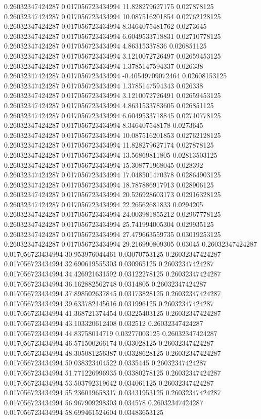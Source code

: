 0.26032347424287 0.017056723434994 11.828279627175 0.027878125
0.26032347424287 0.017056723434994 10.087516201854 0.02762128125
0.26032347424287 0.017056723434994 8.3464075481762 0.0273645
0.26032347424287 0.017056723434994 6.6049533718831 0.02710778125
0.26032347424287 0.017056723434994 4.86315337836 0.026851125
0.26032347424287 0.017056723434994 3.1210072726497 0.02659453125
0.26032347424287 0.017056723434994 1.3785147594337 0.026338
0.26032347424287 0.017056723434994 -0.40549709072464 0.02608153125
0.26032347424287 0.017056723434994 1.3785147594343 0.026338
0.26032347424287 0.017056723434994 3.1210072726491 0.02659453125
0.26032347424287 0.017056723434994 4.8631533783605 0.026851125
0.26032347424287 0.017056723434994 6.6049533718845 0.02710778125
0.26032347424287 0.017056723434994 8.346407548178 0.0273645
0.26032347424287 0.017056723434994 10.087516201853 0.02762128125
0.26032347424287 0.017056723434994 11.828279627174 0.027878125
0.26032347424287 0.017056723434994 13.56869811805 0.02813503125
0.26032347424287 0.017056723434994 15.308771968045 0.028392
0.26032347424287 0.017056723434994 17.048501470378 0.02864903125
0.26032347424287 0.017056723434994 18.787886917913 0.028906125
0.26032347424287 0.017056723434994 20.526928603173 0.02916328125
0.26032347424287 0.017056723434994 22.26562681833 0.0294205
0.26032347424287 0.017056723434994 24.003981855212 0.02967778125
0.26032347424287 0.017056723434994 25.741994005304 0.029935125
0.26032347424287 0.017056723434994 27.479663559735 0.03019253125
0.26032347424287 0.017056723434994 29.216990809305 0.03045
0.26032347424287 0.017056723434994 30.953976044461 0.03070753125
0.26032347424287 0.017056723434994 32.690619555303 0.030965125
0.26032347424287 0.017056723434994 34.426921631592 0.03122278125
0.26032347424287 0.017056723434994 36.162882562748 0.0314805
0.26032347424287 0.017056723434994 37.898502637845 0.03173828125
0.26032347424287 0.017056723434994 39.633782145616 0.031996125
0.26032347424287 0.017056723434994 41.368721374454 0.03225403125
0.26032347424287 0.017056723434994 43.103320612408 0.032512
0.26032347424287 0.017056723434994 44.83758014719 0.03277003125
0.26032347424287 0.017056723434994 46.571500266174 0.033028125
0.26032347424287 0.017056723434994 48.305081256387 0.03328628125
0.26032347424287 0.017056723434994 50.038323404522 0.0335445
0.26032347424287 0.017056723434994 51.771226996935 0.03380278125
0.26032347424287 0.017056723434994 53.503792319642 0.034061125
0.26032347424287 0.017056723434994 55.236019658317 0.03431953125
0.26032347424287 0.017056723434994 56.967909298303 0.034578
0.26032347424287 0.017056723434994 58.699461524604 0.03483653125
